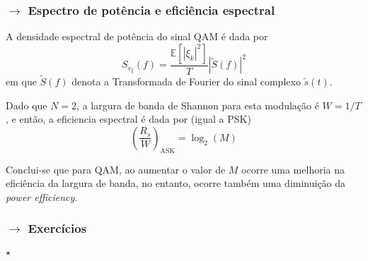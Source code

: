 \subsubsection[5.3.2 Espectro de potência e eficiência espectral]{$\rightarrow$ Espectro de potência e eficiência espectral}

A densidade espectral de potência do sinal QAM é dada por
$$
    S_{v_\xi}(f) = \frac{\mathbb{E}[|\xi_k|^2]}{T}\left|\tilde{S}(f)\right|^2
$$
em que $\tilde{S}(f)$ denota a Transformada de Fourier do sinal complexo $\tilde{s}(t)$.

\vspace{0.5em}
\noindent Dado que $N=2$, a largura de banda de Shannon para esta modulação é $W = 1/T$, e então, a eficiencia espectral é dada por (igual a PSK)
$$
    \left(\frac{R_s}{W}\right)_{\text{ASK}} = \log_2(M)
$$

\vspace{0.5em}
\noindent Conclui-se que para QAM, ao aumentar o valor de $M$ ocorre uma melhoria na eficiência da largura de banda, no entanto, ocorre também uma diminuição da \textit{power efficiency}.

\newpage
\subsubsection[5.3.3 Exercícios]{$\pmb{\rightarrow}$ Exercícios}
\paragraph[5.3.3.1 ]{$\pmb{\star}$ }\mbox{}\\



